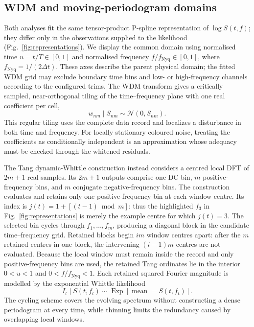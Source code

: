 \subsection{WDM and moving-periodogram domains}
\label{sec:representations}

Both analyses fit the same tensor-product P-spline representation of
$\log S(t,f)$; they differ only in the observations supplied to the likelihood
(Fig.~\ref{fig:representations}).  We display the common domain using normalised
time $u=t/T\in[0,1]$ and normalised frequency
$f/f_{\mathrm{Nyq}}\in[0,1]$, where $f_{\mathrm{Nyq}}=1/(2\Delta t)$.
These axes describe the parent physical domain; the fitted WDM grid may exclude
boundary time bins and low- or high-frequency channels according to the
configured trims.  The WDM transform gives a critically sampled,
near-orthogonal tiling of the time--frequency plane with one real coefficient
per cell,
\begin{equation}
  w_{nm}\mid S_{nm}\sim\mathcal N(0,S_{nm}).
\end{equation}
This regular tiling uses the complete data record and localizes a disturbance in
both time and frequency.  For locally stationary coloured noise, treating the
coefficients as conditionally independent is an approximation whose adequacy
must be checked through the whitened residuals.

The Tang dynamic-Whittle construction instead considers a centred local DFT of
$2m+1$ real samples.  Its $2m+1$ outputs comprise one DC bin, $m$ positive-frequency
bins, and $m$ conjugate negative-frequency bins.  The construction evaluates
and retains only one positive-frequency bin at each window centre.  Its index is
$j(t)=1+[(t-1)\bmod m]$: thus the highlighted $f_3$ in
Fig.~\ref{fig:representations} is merely the example centre for which $j(t)=3$.
The selected bin cycles through $f_1,\ldots,f_m$, producing a diagonal block in the candidate
time--frequency grid.  Retained blocks begin $im$ window centres apart: after
the $m$ retained centres in one block, the intervening $(i-1)m$ centres are not
evaluated.  Because the local window must remain inside the record and only
positive-frequency bins are used, the retained Tang ordinates lie in the
interior $0<u<1$ and $0<f/f_{\mathrm{Nyq}}<1$.  Each retained squared Fourier
magnitude is modelled by the exponential Whittle likelihood
\begin{equation}
  I_t\mid S(t,f_t)\sim\operatorname{Exp}\!\left[
  \operatorname{mean}=S(t,f_t)\right].
\end{equation}
The cycling scheme covers the evolving spectrum without constructing a dense
periodogram at every time, while thinning limits the redundancy caused by
overlapping local windows.

